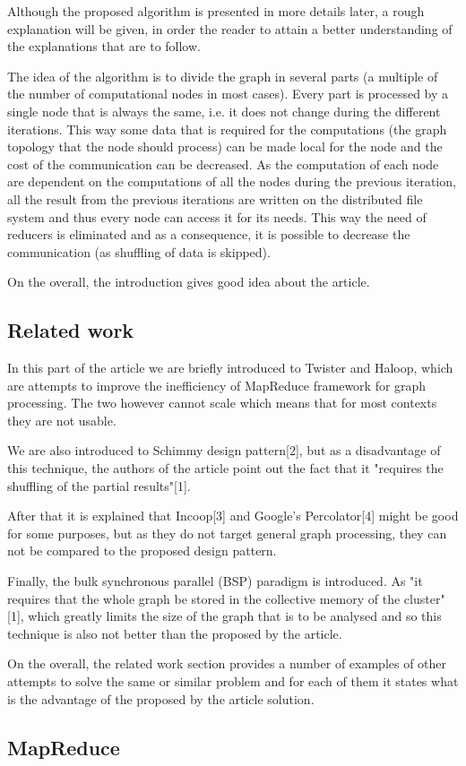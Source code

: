 \documentclass[12pt]{article}
\theoremstyle{plain}
\begin{document}
  Although the proposed algorithm is presented in more details later, a rough
  explanation will be given, in order the reader to attain a better
  understanding of the explanations that are to follow.

  The idea of the algorithm is to divide the graph in several parts (a multiple
  of the number of computational nodes in most cases). Every part is processed
  by a single node that is always the same, i.e. it does not change during the
  different iterations. This way some data that is required for the computations
  (the graph topology that the node should process) can be made local for the
  node and the cost of the communication can be decreased. As the computation of
  each node are dependent on the computations of all the nodes during the previous 
  iteration, all the result from the previous iterations are written on the 
  distributed file system and thus every node can access it for its needs. This
  way the need of reducers is eliminated and as a consequence, it is possible to
  decrease the communication (as shuffling of data is skipped).

  On the overall, the introduction gives good idea about the article.

\subsection{Related work} %
\label{sub:Related work}
  In this part of the article we are briefly introduced to Twister and Haloop,
  which are attempts to improve the inefficiency of MapReduce framework for 
  graph processing. The two however cannot scale which means that for most 
  contexts they are not usable.

  We are also introduced to Schimmy design pattern[2], but as a disadvantage of
  this technique, the authors of the article point out the fact that it
  "requires the shuffling of the partial results"[1].

  After that it is explained that Incoop[3] and Google's Percolator[4] might be
  good for some purposes, but as they do not target general graph processing, 
  they can not be compared to the proposed design pattern.

  Finally, the bulk synchronous parallel (BSP) paradigm is introduced. As "it
  requires that the whole graph be stored in the collective memory of the
  cluster"[1], which greatly limits the size of the graph that is to be analysed
  and so this technique is also not better than the proposed by the article.

  On the overall, the related work section provides a number of examples of 
  other attempts to solve the same or similar problem and for each of them it
  states what is the advantage of the proposed by the article solution.

\subsection{MapReduce} %
\label{sub:MapReduce}
  

\end{document}
